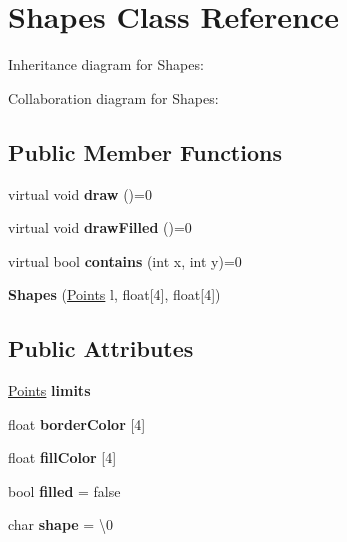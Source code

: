 \hypertarget{classShapes}{}\section{Shapes Class Reference}
\label{classShapes}


Inheritance diagram for Shapes\+:


Collaboration diagram for Shapes\+:
\subsection*{Public Member Functions}
\begin{DoxyCompactItemize}
\item 
virtual void {\bfseries draw} ()=0\hypertarget{classShapes_aa8b75ae6ac367c0d5bc415d784c61def}{}\label{classShapes_aa8b75ae6ac367c0d5bc415d784c61def}

\item 
virtual void {\bfseries draw\+Filled} ()=0\hypertarget{classShapes_aac54e998f5d8f040821aa0559b5ce91d}{}\label{classShapes_aac54e998f5d8f040821aa0559b5ce91d}

\item 
virtual bool {\bfseries contains} (int x, int y)=0\hypertarget{classShapes_ada6f6424028f34b2f3ed870f0fd9843b}{}\label{classShapes_ada6f6424028f34b2f3ed870f0fd9843b}

\item 
{\bfseries Shapes} (\hyperlink{structPoints}{Points} l, float\mbox{[}4\mbox{]}, float\mbox{[}4\mbox{]})\hypertarget{classShapes_acf5ebc7b8a9bc8264038a5b0f7a02edf}{}\label{classShapes_acf5ebc7b8a9bc8264038a5b0f7a02edf}

\end{DoxyCompactItemize}
\subsection*{Public Attributes}
\begin{DoxyCompactItemize}
\item 
\hyperlink{structPoints}{Points} {\bfseries limits}\hypertarget{classShapes_aff63979a2c8827d473263fa99f83980a}{}\label{classShapes_aff63979a2c8827d473263fa99f83980a}

\item 
float {\bfseries border\+Color} \mbox{[}4\mbox{]}\hypertarget{classShapes_a722fad22a6fc828b3a9c015f725285a9}{}\label{classShapes_a722fad22a6fc828b3a9c015f725285a9}

\item 
float {\bfseries fill\+Color} \mbox{[}4\mbox{]}\hypertarget{classShapes_a7cd7ea6ae4857865b2a0aa97bd2ca3fe}{}\label{classShapes_a7cd7ea6ae4857865b2a0aa97bd2ca3fe}

\item 
bool {\bfseries filled} = false\hypertarget{classShapes_afb2283799242f763164586456b8180de}{}\label{classShapes_afb2283799242f763164586456b8180de}

\item 
char {\bfseries shape} = \textquotesingle{}\textbackslash{}0\textquotesingle{}\hypertarget{classShapes_a6bdb79d6b1cc40057874fb6e3c347302}{}\label{classShapes_a6bdb79d6b1cc40057874fb6e3c347302}

\end{DoxyCompactItemize}
